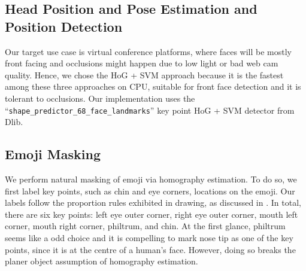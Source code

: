 \documentclass{article}
\begin{document}
\subsection{Head Position and Pose Estimation and Position Detection}
Our target use case is virtual conference platforms, where faces will be mostly front facing and occlusions might happen due to low light or bad web cam quality. Hence, we chose the HoG + SVM approach because it is the fastest among these three approaches on CPU, suitable for front face detection and it is tolerant to occlusions. Our implementation uses the ``\texttt{shape\_predictor\_68\_face\_landmarks}'' key point HoG + SVM detector from Dlib. 

\subsection{Emoji Masking\label{Emoji Masking}}
We perform natural masking of emoji via homography estimation. To do so, we first label key points, such as chin and eye corners, locations on the emoji. Our labels follow the proportion rules exhibited in drawing, as discussed in \cite{tds, fussell}. In total, there are six key points: left eye outer corner, right eye outer corner, mouth left corner, mouth right corner, philtrum, and chin. At the first glance, philtrum seems like a odd choice and it is compelling to mark nose tip as one of the key points, since it is at the centre of a human's face. However, doing so breaks the planer object assumption of homography estimation. 
\end{document}
